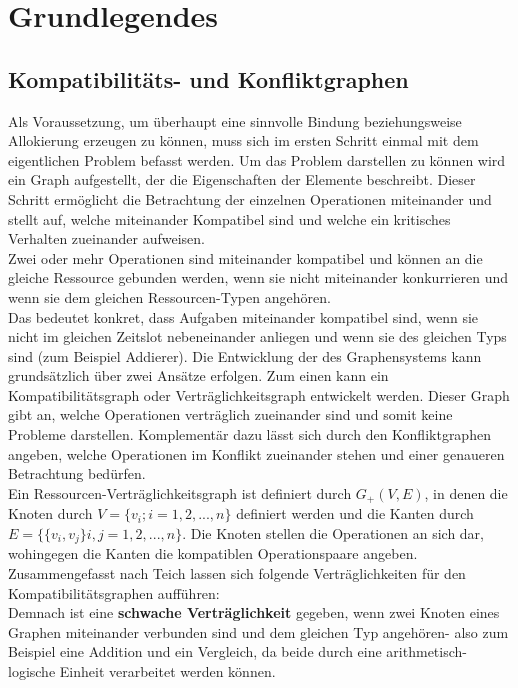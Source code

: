 \documentclass[conference]{IEEEtran}
\begin{document}
\section{Grundlegendes}

\subsection{Kompatibilitäts- und Konfliktgraphen}
Als Voraussetzung, um überhaupt eine sinnvolle Bindung beziehungsweise Allokierung erzeugen zu können, muss sich im ersten Schritt einmal mit dem eigentlichen Problem befasst werden. Um das Problem darstellen zu können wird ein Graph aufgestellt, der die Eigenschaften der Elemente beschreibt. Dieser Schritt ermöglicht die Betrachtung der einzelnen Operationen miteinander und stellt auf, welche miteinander Kompatibel sind und welche ein kritisches Verhalten zueinander aufweisen.\\
Zwei oder mehr Operationen sind miteinander kompatibel und können an die gleiche Ressource gebunden werden, wenn sie nicht miteinander konkurrieren und wenn sie dem gleichen Ressourcen-Typen angehören.\cite[S.231]{3}\\
Das bedeutet konkret, dass Aufgaben miteinander kompatibel sind, wenn sie nicht im gleichen Zeitslot nebeneinander anliegen und wenn sie des gleichen Typs sind (zum Beispiel Addierer).
Die Entwicklung der des Graphensystems kann grundsätzlich über zwei Ansätze erfolgen. Zum einen kann ein Kompatibilitätsgraph oder Verträglichkeitsgraph entwickelt werden. Dieser Graph gibt an, welche Operationen verträglich zueinander sind und somit keine Probleme darstellen. Komplementär dazu lässt sich durch den Konfliktgraphen angeben, welche Operationen im Konflikt zueinander stehen und einer genaueren Betrachtung bedürfen.\\
Ein Ressourcen-Verträglichkeitsgraph ist definiert durch $ G_+(V,E)$, in denen die Knoten durch $ V = \{v_i;i=1,2,...,n\}$ definiert werden und die Kanten durch $E = \{\{v_i,v_j\}i,j = 1,2,...,n\}$. Die Knoten stellen die Operationen an sich dar, wohingegen die Kanten die kompatiblen Operationspaare angeben\cite[S.231]{3}.\\
Zusammengefasst nach  Teich \cite[S. 181-182]{1} lassen sich folgende Verträglichkeiten für den Kompatibilitätsgraphen aufführen:\\

Demnach ist eine \textbf{schwache Verträglichkeit} gegeben, wenn zwei Knoten
eines Graphen miteinander verbunden sind und dem gleichen Typ angehören- also zum Beispiel eine Addition und ein Vergleich, da beide durch eine arithmetisch-logische Einheit verarbeitet werden können\cite[S. 181]{1}.\\
\end{document}
